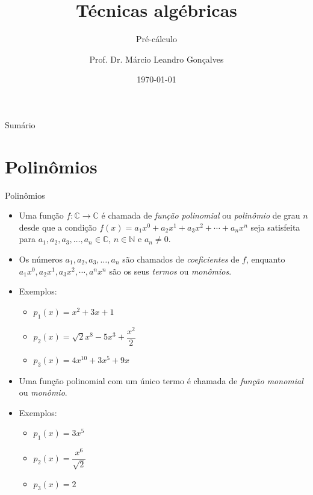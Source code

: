 \documentclass[14pt, aspectratio=169]{beamer}
\title{Técnicas algébricas}
\subtitle{Pré-cálculo}
\author{Prof. Dr. Márcio Leandro Gonçalves}
\date{\today}
\institute{PUC Minas - Poços de Caldas}
\newcommand{\C}{\mathbb{C}}
\newcommand{\N}{\mathbb{N}}
\newcommand{\skipframe}{\vspace{10.0cm}}
\begin{document}
\begin{frame}
\maketitle 
\end{frame}

\begin{frame}{Sumário}
    \tableofcontents
\end{frame}

\section{Polinômios}

\begin{frame}[allowframebreaks]{Polinômios}

\begin{itemize}
    \item Uma função $f: \C \rightarrow \C$ é chamada de \emph{função polinomial} ou \emph{polinômio} de grau $n$ desde que a condição $f(x) = a_1 x^0 + a_2 x^1 + a_3 x^2 + \cdots + a_n x^n$ seja satisfeita para $a_1, a_2, a_3, \ldots, a_n \in \C$, $n \in \N$ e $a_n \neq 0$.

    \item Os números $a_1, a_2, a_3, \ldots, a_n$ são chamados de \emph{coeficientes} de $f$, enquanto $a_1 x^0, a_2 x^1, a_3 x^2, \cdots, a^n x^n$ são os seus \emph{termos} ou \emph{monômios}.

    \skipframe

    \item Exemplos:
    \begin{itemize}
        \item $p_1(x) = x^2 + 3x + 1$
        \item $p_2(x) = \sqrt{2}x^8 - 5x^3 + \dfrac{x^2}{2}$
        \item $p_3(x) = 4x^{10} + 3x^5 + 9x$
    \end{itemize}

    \skipframe

    \item Uma função polinomial com um único termo é chamada de \emph{função monomial} ou \emph{monômio}.

    \item Exemplos:
    \begin{itemize}
        \item $p_1(x) = 3x^5$
        \item $p_2(x) = \dfrac{x^6}{\sqrt{2}}$
        \item $p_3(x) = 2$
    \end{itemize}


\end{itemize}
\end{frame}
\end{document}
